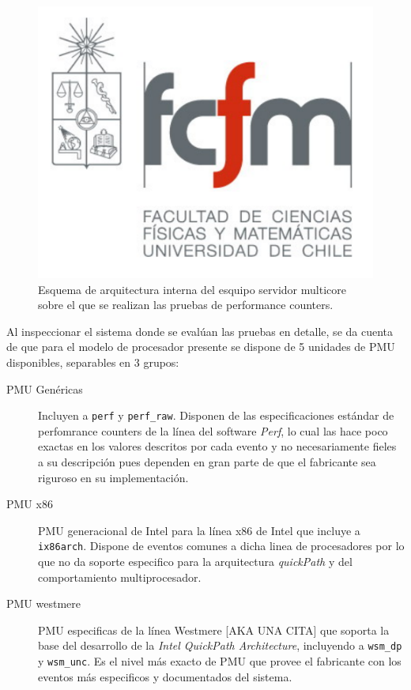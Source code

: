 \begin{figure}[!h]
	\centering
	\includegraphics[scale=.3]{imagenes/fcfm}
	\caption{Esquema de arquitectura interna del esquipo servidor multicore sobre el que se realizan las pruebas de performance counters.}
	\label{fig:hwspecs}
\end{figure}

Al inspeccionar el sistema donde se evalúan las pruebas en detalle, se da cuenta de que para el modelo de procesador presente se dispone de 5 unidades de PMU disponibles, separables en 3 grupos:
\begin{description}
\item[PMU Genéricas] Incluyen a \verb=perf= y  \verb=perf_raw=. Disponen de las especificaciones estándar de perfomrance counters de la línea del software \emph{Perf}, lo cual las hace poco exactas en los valores descritos por cada evento y no necesariamente fieles a su descripción pues dependen en gran parte de que el fabricante sea riguroso en su implementación.
\item[PMU x86] PMU generacional de Intel para la línea x86 de Intel que incluye a \verb=ix86arch=. Dispone de eventos comunes a dicha linea de procesadores por lo que no da soporte especifico para la arquitectura \emph{quickPath} y del comportamiento multiprocesador.
\item[PMU westmere] PMU especificas de la línea Westmere [AKA UNA CITA] que soporta la base del desarrollo de la \emph{Intel QuickPath Architecture}, incluyendo a \verb=wsm_dp= y \verb=wsm_unc=. Es el nivel más exacto de PMU que provee el fabricante con los eventos más especificos y documentados del sistema.
\end{description}

